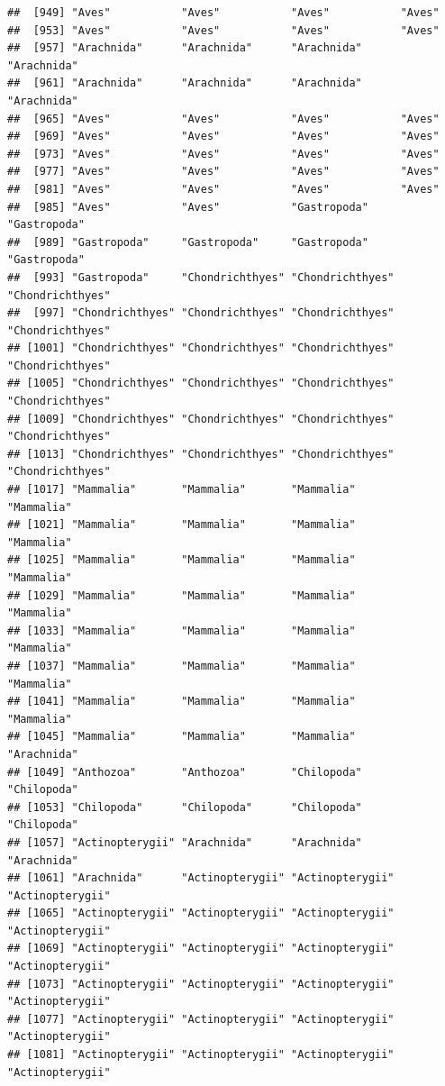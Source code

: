 \documentclass[
]{article}
\begin{document}
\begin{verbatim}
##  [949] "Aves"           "Aves"           "Aves"           "Aves"          
##  [953] "Aves"           "Aves"           "Aves"           "Aves"          
##  [957] "Arachnida"      "Arachnida"      "Arachnida"      "Arachnida"     
##  [961] "Arachnida"      "Arachnida"      "Arachnida"      "Arachnida"     
##  [965] "Aves"           "Aves"           "Aves"           "Aves"          
##  [969] "Aves"           "Aves"           "Aves"           "Aves"          
##  [973] "Aves"           "Aves"           "Aves"           "Aves"          
##  [977] "Aves"           "Aves"           "Aves"           "Aves"          
##  [981] "Aves"           "Aves"           "Aves"           "Aves"          
##  [985] "Aves"           "Aves"           "Gastropoda"     "Gastropoda"    
##  [989] "Gastropoda"     "Gastropoda"     "Gastropoda"     "Gastropoda"    
##  [993] "Gastropoda"     "Chondrichthyes" "Chondrichthyes" "Chondrichthyes"
##  [997] "Chondrichthyes" "Chondrichthyes" "Chondrichthyes" "Chondrichthyes"
## [1001] "Chondrichthyes" "Chondrichthyes" "Chondrichthyes" "Chondrichthyes"
## [1005] "Chondrichthyes" "Chondrichthyes" "Chondrichthyes" "Chondrichthyes"
## [1009] "Chondrichthyes" "Chondrichthyes" "Chondrichthyes" "Chondrichthyes"
## [1013] "Chondrichthyes" "Chondrichthyes" "Chondrichthyes" "Chondrichthyes"
## [1017] "Mammalia"       "Mammalia"       "Mammalia"       "Mammalia"      
## [1021] "Mammalia"       "Mammalia"       "Mammalia"       "Mammalia"      
## [1025] "Mammalia"       "Mammalia"       "Mammalia"       "Mammalia"      
## [1029] "Mammalia"       "Mammalia"       "Mammalia"       "Mammalia"      
## [1033] "Mammalia"       "Mammalia"       "Mammalia"       "Mammalia"      
## [1037] "Mammalia"       "Mammalia"       "Mammalia"       "Mammalia"      
## [1041] "Mammalia"       "Mammalia"       "Mammalia"       "Mammalia"      
## [1045] "Mammalia"       "Mammalia"       "Mammalia"       "Arachnida"     
## [1049] "Anthozoa"       "Anthozoa"       "Chilopoda"      "Chilopoda"     
## [1053] "Chilopoda"      "Chilopoda"      "Chilopoda"      "Chilopoda"     
## [1057] "Actinopterygii" "Arachnida"      "Arachnida"      "Arachnida"     
## [1061] "Arachnida"      "Actinopterygii" "Actinopterygii" "Actinopterygii"
## [1065] "Actinopterygii" "Actinopterygii" "Actinopterygii" "Actinopterygii"
## [1069] "Actinopterygii" "Actinopterygii" "Actinopterygii" "Actinopterygii"
## [1073] "Actinopterygii" "Actinopterygii" "Actinopterygii" "Actinopterygii"
## [1077] "Actinopterygii" "Actinopterygii" "Actinopterygii" "Actinopterygii"
## [1081] "Actinopterygii" "Actinopterygii" "Actinopterygii" "Actinopterygii"

\end{verbatim}
\end{document}
